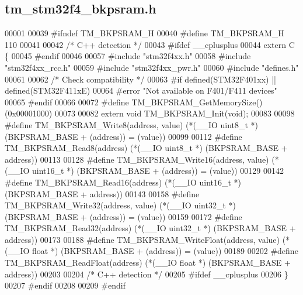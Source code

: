 \hypertarget{tm__stm32f4__bkpsram_8h_source}{}\subsection{tm\+\_\+stm32f4\+\_\+bkpsram.\+h}

\begin{DoxyCode}
00001 
00039 \textcolor{preprocessor}{#ifndef TM\_BKPSRAM\_H}
00040 \textcolor{preprocessor}{#define TM\_BKPSRAM\_H 110}
00041 
00042 \textcolor{comment}{/* C++ detection */}
00043 \textcolor{preprocessor}{#ifdef \_\_cplusplus}
00044 \textcolor{keyword}{extern} C \{
00045 \textcolor{preprocessor}{#endif}
00046 
00057 \textcolor{preprocessor}{#include "stm32f4xx.h"}
00058 \textcolor{preprocessor}{#include "stm32f4xx\_rcc.h"}
00059 \textcolor{preprocessor}{#include "stm32f4xx\_pwr.h"}
00060 \textcolor{preprocessor}{#include "defines.h"}
00061 
00062 \textcolor{comment}{/* Check compatibility */}
00063 \textcolor{preprocessor}{#if defined(STM32F401xx) || defined(STM32F411xE)}
00064 \textcolor{preprocessor}{    #error "Not available on F401/F411 devices"}
00065 \textcolor{preprocessor}{#endif  }
00066     
00072 \textcolor{preprocessor}{#define TM\_BKPSRAM\_GetMemorySize()          (0x00001000)}
00073 
00082 \textcolor{keyword}{extern} \textcolor{keywordtype}{void} TM\_BKPSRAM\_Init(\textcolor{keywordtype}{void});
00083 
00098 \textcolor{preprocessor}{#define TM\_BKPSRAM\_Write8(address, value)   (*(\_\_IO uint8\_t *) (BKPSRAM\_BASE + (address)) = (value))}
00099 
00112 \textcolor{preprocessor}{#define TM\_BKPSRAM\_Read8(address)           (*(\_\_IO uint8\_t *) (BKPSRAM\_BASE + address))}
00113 
00128 \textcolor{preprocessor}{#define TM\_BKPSRAM\_Write16(address, value)  (*(\_\_IO uint16\_t *) (BKPSRAM\_BASE + (address)) = (value))}
00129 
00142 \textcolor{preprocessor}{#define TM\_BKPSRAM\_Read16(address)          (*(\_\_IO uint16\_t *) (BKPSRAM\_BASE + address))}
00143 
00158 \textcolor{preprocessor}{#define TM\_BKPSRAM\_Write32(address, value)  (*(\_\_IO uint32\_t *) (BKPSRAM\_BASE + (address)) = (value))}
00159 
00172 \textcolor{preprocessor}{#define TM\_BKPSRAM\_Read32(address)          (*(\_\_IO uint32\_t *) (BKPSRAM\_BASE + address))}
00173 
00188 \textcolor{preprocessor}{#define TM\_BKPSRAM\_WriteFloat(address, value)   (*(\_\_IO float *) (BKPSRAM\_BASE + (address)) = (value))}
00189 
00202 \textcolor{preprocessor}{#define TM\_BKPSRAM\_ReadFloat(address)           (*(\_\_IO float *) (BKPSRAM\_BASE + address))}
00203 
00204 \textcolor{comment}{/* C++ detection */}
00205 \textcolor{preprocessor}{#ifdef \_\_cplusplus}
00206 \}
00207 \textcolor{preprocessor}{#endif}
00208 
00209 \textcolor{preprocessor}{#endif}
\end{DoxyCode}
